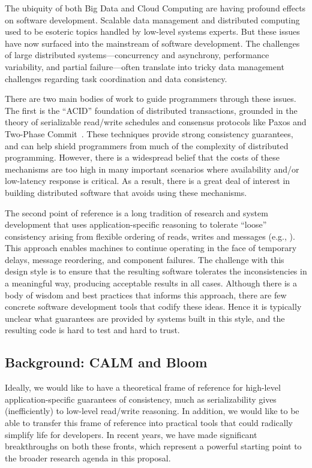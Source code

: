 The ubiquity of both Big Data and Cloud Computing are having profound effects on software development. Scalable data management and distributed computing used to be esoteric topics handled by low-level systems experts.  But these issues have now surfaced into the mainstream of software development.   The challenges of large distributed systems---concurrency and asynchrony, performance variability, and partial failure---often translate into tricky data management challenges regarding task coordination and data consistency.

There are two main bodies of work to guide programmers through these issues.  The first is the ``ACID'' foundation of distributed transactions, grounded in the theory of serializable read/write schedules and consensus protocols like Paxos and Two-Phase Commit~\cite{grayreuter}.  These techniques provide strong consistency guarantees, and can help shield programmers from much of the complexity of distributed programming. However, there is a widespread belief that the costs of these mechanisms are too high in many important scenarios where availability and/or low-latency response is critical.
As a result, there is a great deal of interest in building distributed software that avoids using these mechanisms.

The second point of reference is a long tradition of research and system development that uses application-specific reasoning to tolerate ``loose'' consistency arising from flexible ordering of reads, writes and messages (e.g., \cite{sagas,beyond,quicksand,base,bayou,Shapiro2011b}). This approach enables machines to continue operating in the face of temporary delays, message reordering, and component failures.  
The challenge with this design style is to ensure that the resulting software tolerates the inconsistencies in a meaningful way, producing acceptable results in all cases.  Although there is a body of wisdom and best practices that informs this approach, there are few concrete software development tools that codify these ideas.  Hence it is typically unclear what guarantees are provided by systems built in this style, and the resulting code is hard to test and hard to trust.  

\subsection{Background: CALM and Bloom}
Ideally, we would like to have a theoretical frame of reference for high-level application-specific guarantees of consistency, much as serializability gives (inefficiently) to low-level read/write reasoning. In addition, we would like to be able to transfer this frame of reference into practical tools that could radically simplify life for developers.  In recent years, we have made significant breakthroughs on both these fronts, which represent a powerful starting point to the broader research agenda in this proposal.

